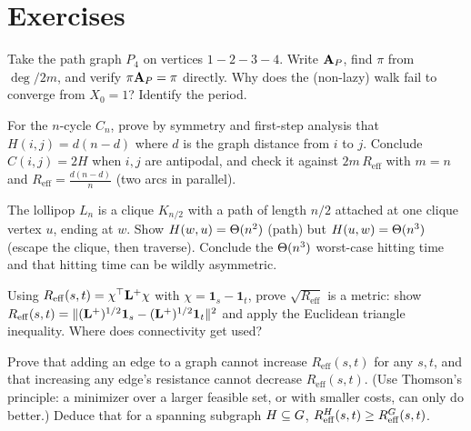 \section*{Exercises}

\begin{exercise}
Take the path graph $P_4$ on vertices $1\!-\!2\!-\!3\!-\!4$. Write $\mathbf{A}_P$, find $\pi$ from $\deg/2m$, and verify $\pi\mathbf{A}_P=\pi$ directly. Why does the (non-lazy) walk fail to converge from $X_0=1$? Identify the period.
\end{exercise}

\begin{exercise}
For the $n$-cycle $C_n$, prove by symmetry and first-step analysis that $H(i,j)=d(n-d)$ where $d$ is the graph distance from $i$ to $j$. Conclude $C(i,j)=2H$ when $i,j$ are antipodal, and check it against $2m\,R_{\mathrm{eff}}$ with $m=n$ and $R_{\mathrm{eff}}=\frac{d(n-d)}{n}$ (two arcs in parallel).
\end{exercise}

\begin{exercise}
The lollipop $L_n$ is a clique $K_{n/2}$ with a path of length $n/2$ attached at one clique vertex $u$, ending at $w$. Show $H(w,u)=\Theta(n^2)$ (path) but $H(u,w)=\Theta(n^3)$ (escape the clique, then traverse). Conclude the $\Theta(n^3)$ worst-case hitting time and that hitting time can be wildly asymmetric.
\end{exercise}

\begin{exercise}
Using $R_{\mathrm{eff}}(s,t)=\chi^\top\mathbf{L}^+\chi$ with $\chi=\mathbf{1}_s-\mathbf{1}_t$, prove $\sqrt{R_{\mathrm{eff}}}$ is a metric: show $R_{\mathrm{eff}}(s,t)=\lVert(\mathbf{L}^+)^{1/2}\mathbf{1}_s-(\mathbf{L}^+)^{1/2}\mathbf{1}_t\rVert^2$ and apply the Euclidean triangle inequality. Where does connectivity get used?
\end{exercise}

\begin{exercise}
Prove that adding an edge to a graph cannot increase $R_{\mathrm{eff}}(s,t)$ for any $s,t$, and that increasing any edge's resistance cannot decrease $R_{\mathrm{eff}}(s,t)$. (Use Thomson's principle: a minimizer over a larger feasible set, or with smaller costs, can only do better.) Deduce that for a spanning subgraph $H\subseteq G$, $R^{H}_{\mathrm{eff}}(s,t)\ge R^{G}_{\mathrm{eff}}(s,t)$.
\end{exercise}

